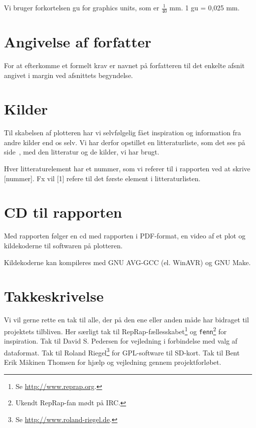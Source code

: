 Vi bruger forkortelsen gu for graphics units, som er $\tfrac 1{40}$
mm. 1 gu = 0,025 mm.


\section{Angivelse af forfatter}

For at efterkomme et formelt krav er navnet på forfatteren til det
enkelte afsnit angivet i margin ved afsnittets begyndelse.


\section{Kilder}
Til skabelsen af plotteren har vi selvfølgelig fået inspiration og
information fra andre kilder end os selv. Vi har derfor opstillet en
litteraturliste, som det ses på side~\pageref{ch:litteratur}, med den
litteratur og de kilder, vi har brugt.

Hver litteraturelement har et nummer, som vi referer til i rapporten
ved at skrive [nummer]. Fx vil [1] refere til det første element i
litteraturlisten.


\section{CD til rapporten}

Med rapporten følger en cd med rapporten i PDF-format, en video af et
plot og kildekoderne til softwaren på plotteren.

Kildekoderne kan kompileres med GNU AVG-GCC (el. WinAVR) og GNU Make.


\section{Takkeskrivelse}


Vi vil gerne rette en tak til alle, der på den ene eller anden måde
har bidraget til projektets tilbliven. Her særligt tak til
RepRap-fællesskabet\footnote{Se \url{http://www.reprap.org}.} og
\texttt{fenn}\footnote{Ukendt RepRap-fan mødt på IRC.} for
inspiration. Tak til David S. Pedersen for vejledning i forbindelse
med valg af dataformat. Tak til Roland Riegel\footnote{Se
  \url{http://www.roland-riegel.de}.} for GPL-software til
SD-kort. Tak til Bent Erik Mäkinen Thomsen for hjælp og vejledning
gennem projektforløbet.



